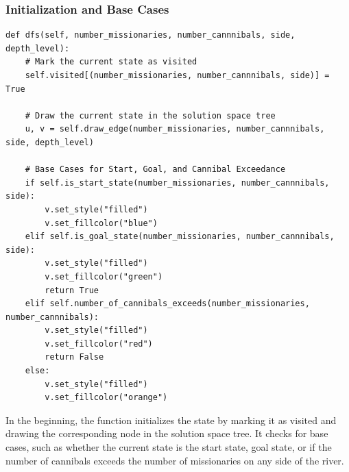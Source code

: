 \documentclass[12pt]{article}
\begin{document}
\subsubsection*{Initialization and Base Cases}
\begin{verbatim}
def dfs(self, number_missionaries, number_cannnibals, side, depth_level):
    # Mark the current state as visited
    self.visited[(number_missionaries, number_cannnibals, side)] = True
    
    # Draw the current state in the solution space tree
    u, v = self.draw_edge(number_missionaries, number_cannnibals, side, depth_level)
    
    # Base Cases for Start, Goal, and Cannibal Exceedance
    if self.is_start_state(number_missionaries, number_cannnibals, side):
        v.set_style("filled")
        v.set_fillcolor("blue")
    elif self.is_goal_state(number_missionaries, number_cannnibals, side):
        v.set_style("filled")
        v.set_fillcolor("green")
        return True
    elif self.number_of_cannibals_exceeds(number_missionaries, number_cannnibals):
        v.set_style("filled")
        v.set_fillcolor("red")
        return False
    else:
        v.set_style("filled")
        v.set_fillcolor("orange")
\end{verbatim}
    \vspace*{5mm}
In the beginning, the function initializes the state by marking it as visited and drawing the corresponding node in the solution space tree. It checks for base cases, such as whether the current state is the start state, goal state, or if the number of cannibals exceeds the number of missionaries on any side of the river.
\end{document}
